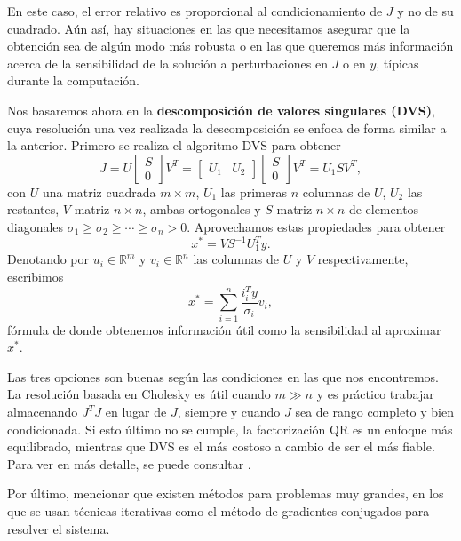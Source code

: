 \documentclass[11pt,a4paper]{book}
\theoremstyle{definition}
\theoremstyle{remark}
\begin{document}
En este caso, el error relativo es proporcional al condicionamiento de $J$ y no de su cuadrado.
Aún así, hay situaciones en las que necesitamos asegurar que la obtención sea de algún modo más robusta
o en las que queremos más información acerca de la sensibilidad de la solución a perturbaciones en $J$
o en $y$, típicas durante la computación.

Nos basaremos ahora en la \textbf{descomposición de valores singulares (DVS)}, cuya resolución una vez
realizada la descomposición se enfoca de forma similar a la anterior. Primero se realiza el algoritmo DVS
para obtener 
\begin{equation}
	J = U \left[ \begin{array}{c} S \\ 0 \end{array} \right] V^T =
	\left[ \begin{array}{cc} U_1 & U_2 \end{array} \right]
	\left[ \begin{array}{c} S \\ 0 \end{array} \right] V^T =
	U_1 S V^T,
\end{equation}
con $U$ una matriz cuadrada $m \times m$, $U_1$ las primeras $n$ columnas de $U$,
$U_2$ las restantes, $V$ matriz $n \times n$, ambas ortogonales y $S$
matriz $n \times n$ de elementos diagonales $\sigma_1 \geq \sigma_2 \geq \cdots \geq \sigma_n > 0$.
Aprovechamos estas propiedades para obtener
\begin{equation}
	x^* = VS^{-1}U_1^Ty.
\end{equation}
Denotando por $u_i \in \mathbb{R}^m$ y $v_i \in \mathbb{R}^n$ las columnas de $U$ y $V$ respectivamente, escribimos
\begin{equation}
	x^* = \sum_{i=1}^n \frac{i_i^Ty}{\sigma_i}v_i,
\end{equation}
fórmula de donde obtenemos información útil como la sensibilidad al aproximar $x^*$.

Las tres opciones son buenas según las condiciones en las que nos encontremos. La resolución basada en Cholesky es útil cuando $m\gg n$ y es práctico trabajar almacenando $J^TJ$ en lugar de $J$, siempre y cuando $J$ sea de rango completo y bien condicionada. Si esto último no se cumple, la factorización QR es un enfoque más equilibrado, mientras que DVS es el más costoso a cambio de ser el más fiable. Para ver en más detalle, se puede consultar \cite[Sección 10.2]{Nocedal2006-kh}.

Por último, mencionar que existen métodos para problemas muy grandes, en los que se usan técnicas iterativas como el método de gradientes conjugados para resolver el sistema.
\end{document}
